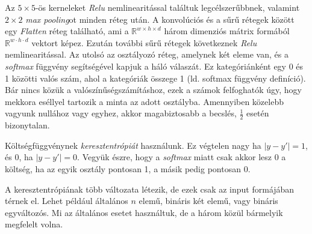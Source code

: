 %
%	
%	
%	
%	
%	
%	
%	
%	
%	
%	
%	
%	
%


Az $ 5 \times 5 $-ös kerneleket \textit{Relu} nemlinearitással találtuk legcélszerűbbnek,
valamint $ 2 \times 2 $ \textit{max pooling}ot minden réteg után.
A konvolúciós és a sűrű rétegek között egy \textit{Flatten} réteg található,
ami a $ \mathbb{R}^{w \times h \times d} $ három dimenziós mátrix formából 
$ \mathbb{R}^{w \cdot h \cdot d} $ vektort képez. Ezután további sűrű rétegek
következnek \textit{Relu} nemlinearitással. Az utolsó az osztályozó
réteg, amelynek két eleme van, és a \textit{softmax} függvény segítségével kapjuk
a háló válaszát. Ez kategóriánként egy 0 és 1 közötti valós szám, ahol a kategóriák 
összege 1 (ld. softmax függvény definíció). Bár nincs közük a valószínűségszámításhoz, 
ezek a számok felfoghatók úgy, hogy mekkora eséllyel tartozik a minta az adott osztályba.
Amennyiben közelebb vagyunk nullához vagy egyhez, akkor magabiztosabb a becslés, 
$ \frac{1}{2} $ esetén bizonytalan.

Költségfüggvénynek \textit{keresztentrópiát} használunk. Ez végtelen nagy ha $ |y-y'|=1 $,
és 0, ha $ |y-y'|=0 $. Vegyük észre, hogy a \textit{softmax} miatt csak akkor lesz 0
a költség, ha az egyik osztály pontosan 1, a másik pedig pontosan 0.

A keresztentrópiának több változata létezik, de ezek csak az input formájában térnek
el. Lehet például általános $ n $ elemű, bináris két elemű, vagy bináris egyváltozós.
Mi az általános esetet használtuk, de a három közül bármelyik megfelelt volna.


